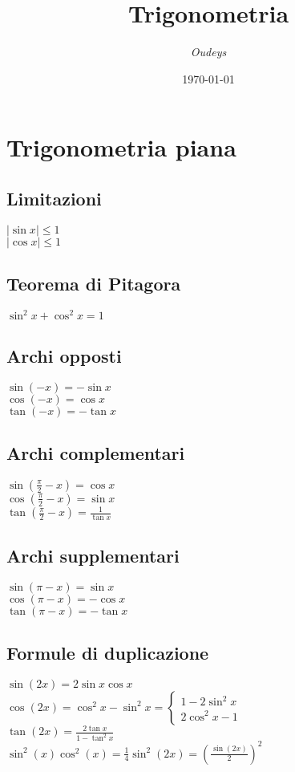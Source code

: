 \documentclass[a4paper,12pt]{article}
\title{\textbf{Trigonometria}}
\author{\textit{Oudeys}}
\date{\today}
\theoremstyle{mystyle}
\begin{document}
\maketitle


\tableofcontents
\newpage

\section{Trigonometria piana}
\subsection{Limitazioni}
\(\lvert \sin x \rvert \leq 1 \)\\
\(\lvert \cos x \rvert \leq 1 \)

\subsection{Teorema di Pitagora}
\(\sin ^2 x + \cos^2 x = 1\)

\subsection{Archi opposti}
\(\sin(-x) = - \sin x \)\\
\(\cos (-x) = \cos x \)\\
\(\tan (-x) = -\tan x \)


\subsection{Archi complementari}
\(\sin \left ( \frac{\pi}{2} -x \right) = \cos x \)\\
\(\cos \left (\frac{\pi}{2}-x  \right) = \sin x \)\\
\(\tan \left ( \frac{\pi}{2} -x\right) = \frac{1}{\tan x} \)

\subsection{Archi supplementari}
\(\sin(\pi - x) = \sin x \)\\
\(\cos (\pi - x) = - \cos x \)\\
\(\tan ( \pi - x) = - \tan x \)

\subsection{Formule di duplicazione}
\(\sin(2x) = 2\sin x \cos x \)\\
\(\cos(2x) = \cos^2 x - \sin^2 x = \begin{cases} 1 - 2 \sin^2 x & \\
2\cos^2 x - 1 \end{cases} \)\\
\(\tan (2x) = \frac{2 \tan x}{1 - \tan^2 x} \)\\
\(\sin^2(x)\cos^2(x) = \frac{1}{4}\sin^2 (2x) = \left( \frac{\sin(2x)}{2}\right)^2 \)
\end{document}
